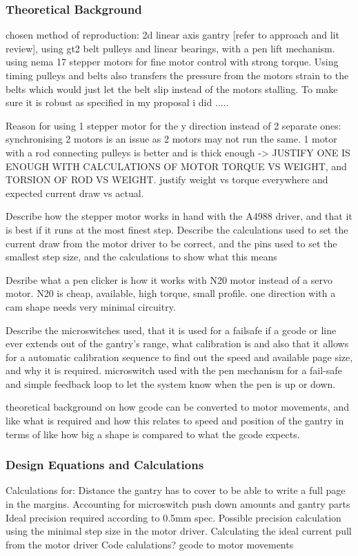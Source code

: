 \subsubsection{Theoretical Background}
chosen method of reproduction: 2d linear axis gantry [refer to approach and lit review], using gt2 belt pulleys and linear bearings, with a pen lift mechanism. using nema 17 stepper motors for fine motor control with strong torque. Using timing pulleys and belts also transfers the pressure from the motors strain to the belts which would just let the belt slip instead of the motors stalling. To make sure it is robust as specified in my proposal i did ..... 

Reason for using 1 stepper motor for the y direction instead of 2 separate ones: synchronising 2 motors is an issue as 2 motors may not run the same. 1 motor with a rod connecting pulleys is better and is thick enough -> JUSTIFY ONE IS ENOUGH WITH CALCULATIONS OF MOTOR TORQUE VS WEIGHT, and TORSION OF ROD VS WEIGHT. justify weight vs torque everywhere and expected current draw vs actual.

Describe how the stepper motor works in hand with the A4988 driver, and that it is best if it runs at the most finest step. Describe the calculations used to set the current draw from the motor driver to be correct, and the pins used to set the smallest step size, and the calculations to show what this means

Desribe what a pen clicker is how it works with N20 motor instead of a servo motor.  N20 is cheap, available, high torque, small profile. one direction with a cam shape needs very minimal circuitry. 

Describe the microswitches used, that it is used for a failsafe if a gcode or line ever extends out of the gantry's range, what calibration is and also that it allows for a automatic calibration sequence to find out the speed and available page size, and why it is required. microswitch used with the pen mechanism for a fail-safe and simple feedback loop to let the system know when the pen is up or down. 

theoretical background on how gcode can be converted to motor movements, and like what is required and how this relates to speed and position of the gantry in terms of like how big a shape is compared to what the gcode expects.


\subsubsection{Design Equations and Calculations}
Calculations for: Distance the gantry has to cover to be able to write a full page in the margins. Accounting for microswitch push down amounts and gantry parts
Ideal precision required according to 0.5mm spec. 
Possible precision calculation using the minimal step size in the motor driver.
Calculating the ideal current pull from the motor driver
Code calulations? gcode to motor movements
